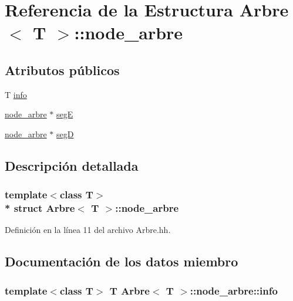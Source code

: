 \hypertarget{struct_arbre_1_1node__arbre}{}\section{Referencia de la Estructura Arbre$<$ T $>$\+:\+:node\+\_\+arbre}
\label{struct_arbre_1_1node__arbre}
\subsection*{Atributos públicos}
\begin{DoxyCompactItemize}
\item 
T \hyperlink{struct_arbre_1_1node__arbre_a5a146e5e27a7a6c5f54bc6df864595aa}{info}
\item 
\hyperlink{struct_arbre_1_1node__arbre}{node\+\_\+arbre} $\ast$ \hyperlink{struct_arbre_1_1node__arbre_add2e7f2ee789db9f38a3bf2d2dd36972}{segE}
\item 
\hyperlink{struct_arbre_1_1node__arbre}{node\+\_\+arbre} $\ast$ \hyperlink{struct_arbre_1_1node__arbre_a9986e206810ba9e519b5b6e590238093}{segD}
\end{DoxyCompactItemize}


\subsection{Descripción detallada}
\subsubsection*{template$<$class T$>$\\*
struct Arbre$<$ T $>$\+::node\+\_\+arbre}



Definición en la línea 11 del archivo Arbre.\+hh.



\subsection{Documentación de los datos miembro}
\subsubsection[{\texorpdfstring{info}{info}}]{\setlength{\rightskip}{0pt plus 5cm}template$<$class T$>$ T {\bf Arbre}$<$ T $>$\+::node\+\_\+arbre\+::info}\hypertarget{struct_arbre_1_1node__arbre_a5a146e5e27a7a6c5f54bc6df864595aa}{}\label{struct_arbre_1_1node__arbre_a5a146e5e27a7a6c5f54bc6df864595aa}


